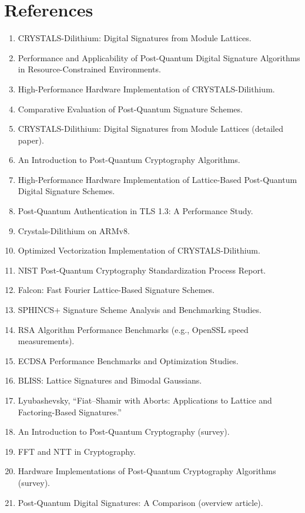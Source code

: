 \documentclass{article}
\begin{document}
\section*{References}
\begin{enumerate}
    \item CRYSTALS-Dilithium: Digital Signatures from Module Lattices. \cite{ref0}
    \item Performance and Applicability of Post-Quantum Digital Signature Algorithms in Resource-Constrained Environments. \cite{ref1}
    \item High-Performance Hardware Implementation of CRYSTALS-Dilithium. \cite{ref2}
    \item Comparative Evaluation of Post-Quantum Signature Schemes. \cite{ref3}
    \item CRYSTALS-Dilithium: Digital Signatures from Module Lattices (detailed paper). \cite{ref4}
    \item An Introduction to Post-Quantum Cryptography Algorithms. \cite{ref5}
    \item High-Performance Hardware Implementation of Lattice-Based Post-Quantum Digital Signature Schemes. \cite{ref6}
    \item Post-Quantum Authentication in TLS 1.3: A Performance Study. \cite{ref7}
    \item Crystals-Dilithium on ARMv8. \cite{ref8}
    \item Optimized Vectorization Implementation of CRYSTALS-Dilithium. \cite{ref9}
    \item NIST Post-Quantum Cryptography Standardization Process Report. \cite{ref10}
    \item Falcon: Fast Fourier Lattice-Based Signature Schemes. \cite{ref11}
    \item SPHINCS+ Signature Scheme Analysis and Benchmarking Studies. \cite{ref12}
    \item RSA Algorithm Performance Benchmarks (e.g., OpenSSL speed measurements). \cite{ref13}
    \item ECDSA Performance Benchmarks and Optimization Studies. \cite{ref14}
    \item BLISS: Lattice Signatures and Bimodal Gaussians. \cite{ref15}
    \item Lyubashevsky, ``Fiat--Shamir with Aborts: Applications to Lattice and Factoring-Based Signatures.'' \cite{ref16}
    \item An Introduction to Post-Quantum Cryptography (survey). \cite{ref17}
    \item FFT and NTT in Cryptography. \cite{ref18}
    \item Hardware Implementations of Post-Quantum Cryptography Algorithms (survey). \cite{ref19}
    \item Post-Quantum Digital Signatures: A Comparison (overview article). \cite{ref20}
\end{enumerate}
\end{document}
